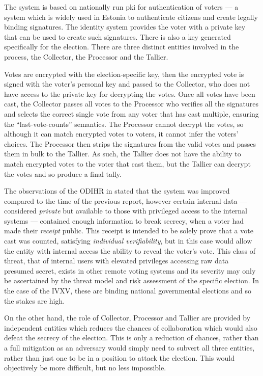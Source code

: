 The system is based on nationally run \gls{pki} for authentication of voters --- a system which is widely used in Estonia to authenticate citizens and create legally binding signatures. The identity system provides the voter with a private key that can be used to create such signatures. There is also a key generated specifically for the election. There are three distinct entities involved in the process, the Collector, the Processor and the Tallier.

Votes are encrypted with the election-specific key, then the encrypted vote is signed with the voter's personal key and passed to the Collector, who does not have access to the private key for decrypting the votes. Once all votes have been cast, the Collector passes all votes to the Processor who verifies all the signatures and selects the correct single vote from any voter that has cast multiple, ensuring the ``last-vote-counts'' semantics. The Processor cannot decrypt the votes, so although it can match encrypted votes to voters, it cannot infer the voters' choices. The Processor then strips the signatures from the valid votes and passes them in bulk to the Tallier. As such, the Tallier does not have the ability to match encrypted votes to the voter that cast them, but the Tallier can decrypt the votes and so produce a final tally.

The observations of the ODIHR in \cite{OSCEODIHRElection2019} stated that the system was improved compared to the time of the previous report, however certain internal data --- considered \emph{private} but available to those with privileged access to the internal systems --- contained enough information to break secrecy, when a voter had made their \emph{receipt} public. This receipt is intended to be solely prove that a vote cast was counted, satisfying \emph{individual verifiability}, but in this case would allow the entity with internal access the ability to reveal the voter's vote. This class of threat, that of internal users with elevated privileges accessing raw data presumed secret, exists in other remote voting systems and its severity may only be ascertained by the threat model and risk assessment of the specific election. In the case of the IVXV, these are binding national governmental elections and so the stakes are high.

On the other hand, the role of Collector, Processor and Tallier are provided by independent entities which reduces the chances of collaboration which would also defeat the secrecy of the election. This is only a reduction of chances, rather than a full mitigation as an adversary would simply need to subvert all three entities, rather than just one to be in a position to attack the election. This would objectively be more difficult, but no less impossible.

